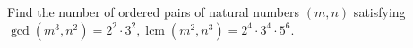 Find the number of ordered pairs of natural numbers $(m,n)$ satisfying $\gcd(m^{3},n^{2})=2^{2}\cdot3^{2}, \operatorname{lcm}(m^{2},n^{3})=2^{4}\cdot3^{4}\cdot5^{6}$.
